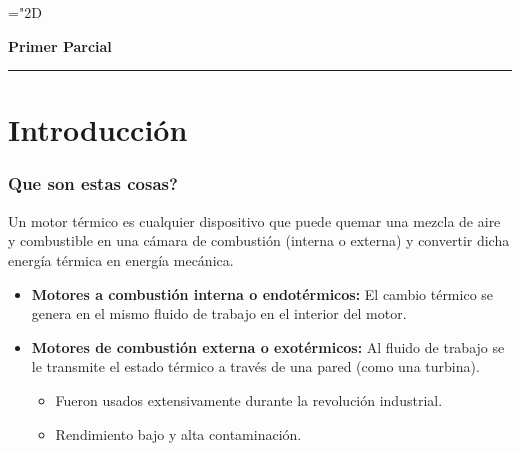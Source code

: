 \newcommand{\rc}{R_c}
\newcommand{\Calorif}{\mbox{\large$\mathbf{c}$}}
\newcommand{\rp}{R_p}
\newcommand{\grad}{$^\circ$}
\newcommand{\Fp}{F_P}
\newcommand{\Peff}{P}
\newcommand{\ideal}{{ideal}}
\newcommand{\perd}{{perd.}}
\newcommand{\Pideal}{P_\ideal}
\newcommand{\Pperd}{P_\perd}
\newcommand{\Pind}{P_i}
\newcommand{\pmi}{p_{mi}}
\newcommand{\Pot}{{ \mbox{\tiny$P$}}}
\newcommand{\Potmax}{{ \mbox{\tiny$P_\max$}}}
\newcommand{\Torq}{{ \mbox{\tiny$T$}}}
\newcommand{\Torqmax}{{ \mbox{\tiny$T_\max$}}}
\newcommand{\Ce}{C_e}
\newcommand{\pme}{p_{me}}
\newcommand{\etaeff}{\eta_{total}}
\newcommand{\etavol}{\eta_{{\mbox{\tiny$V$}}}}
\newcommand{\util}{\acute{u}til}

\renewcommand{\min}{{m\textrm{í}n}}
\renewcommand{\max}{{m\acute{a}x}}
\newcommand{\ctegas}{k}
\newcommand{\rv}{{R_{\mbox{\tiny $V$}}}}
 \mathchardef\mhyphen="2D
 \newcommand{\hyph}{\,\mhyphen}
 \vspace{.9cm}
{\centering 
{\bf \LARGE Primer Parcial \par}
}
\begin{center}
\vspace{-.2cm}\rule{3cm}{2pt}\par
\vspace{-.2cm}
\end{center}
\part{Introducción}
\section{Que son estas cosas?}

Un motor térmico es cualquier dispositivo que puede quemar una mezcla de aire y combustible en una cámara de combustión (interna o externa) y convertir dicha energía térmica en energía mecánica.

\begin{itemize}
    \item {\bf Motores a combustión interna o endotérmicos:} El cambio térmico se genera en el mismo fluido de trabajo en el interior del motor.
    \item {\bf Motores de combustión externa o exotérmicos:} Al fluido de trabajo se le transmite el estado térmico a través de una pared (como una turbina).
    \begin{itemize}
        \item Fueron usados extensivamente durante la revolución industrial.
        \item Rendimiento bajo y alta contaminación.
    \end{itemize}
\end{itemize}

